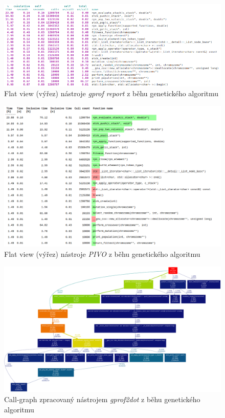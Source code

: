 \documentclass[czech,BP]{thesiskiv}
\begin{document}
\begin{figure}[h]
    \centering
    \includegraphics[interpolate,width=1.0\textwidth]{img/test-ga-orig-flat.png}
    \caption{Flat view (výřez) nástroje \emph{gprof report} z běhu genetického algoritmu}
    \label{obr:testgprofreportflat}
\end{figure}
\vfill
\begin{figure}[h]
    \centering
    \includegraphics[interpolate,width=1.0\textwidth]{img/test-ga-pivo-flat.png}
    \caption{Flat view (výřez) nástroje \emph{PIVO} z běhu genetického algoritmu}
    \label{obr:testgprofpivoflat}
\end{figure}
\vfill

\begin{figure}
    \centering
    \includegraphics[interpolate,width=1.0\textwidth]{img/test-ga-gprof2dot-graph.png}
    \caption{Call-graph zpracovaný nástrojem \emph{gprof2dot} z běhu genetického algoritmu}
    \label{obr:testgprof2dot}
\end{figure}
\end{document}
